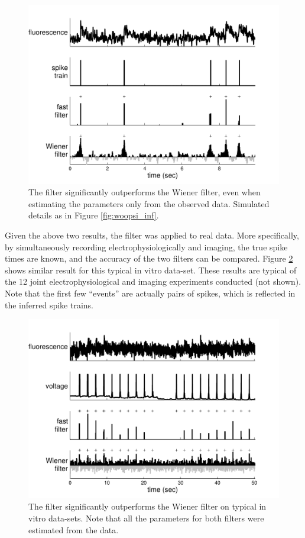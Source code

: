 \begin{figure}[h!]
\centering \includegraphics[width=.9\linewidth]{../figs/woopsi_learn}
\caption{The \foopsi filter significantly outperforms the Wiener filter, even when estimating the parameters only from the observed data.  Simulated details as in Figure \ref{fig:woopsi_inf}.} \label{fig:woopsi_learn}
\end{figure}

Given the above two results, the \foopsi filter was applied to real data.  More specifically, by simultaneously recording electrophysiologically and imaging, the true spike times are known, and the accuracy of the two filters can be compared.  Figure \ref{fig:woopsi_data} shows similar result for this typical in vitro data-set.  These results are typical of the 12 joint electrophysiological and imaging experiments conducted (not shown). Note that the first few ``events'' are actually pairs of spikes, which is reflected in the inferred spike trains.

\begin{figure}[h!]
\centering \includegraphics[width=.9\linewidth]{../figs/woopsi_data4}
\caption{The \foopsi filter significantly outperforms the Wiener filter on typical in vitro data-sets.  Note that all the parameters for both filters were estimated from the data.} \label{fig:woopsi_data}
\end{figure}

